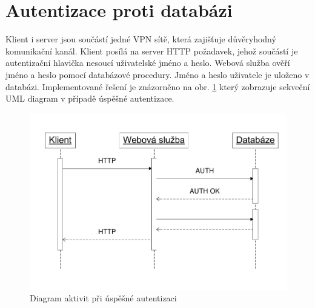\documentclass{diplomka}
\begin{document}
\section{Autentizace proti databázi}
Klient i server jsou součástí jedné VPN sítě, která zajišťuje důvěryhodný komunikační kanál.  Klient posílá na server HTTP požadavek, jehož součástí je autentizační hlavička nesoucí uživatelské jméno a heslo. Webová služba ověří jméno a heslo pomocí databázové procedury. Jméno a heslo uživatele je uloženo v databázi. Implementované řešení je znázorněno na obr. \ref{fig:auth} který zobrazuje sekveční UML diagram v případě úspěšné autentizace.
\begin{figure}[H]
  \centering
  \includegraphics[scale=0.8]{visio/auth.pdf}
\caption{Diagram aktivit při úspěšné autentizaci}
\label{fig:auth}
\end{figure}
\end{document}
